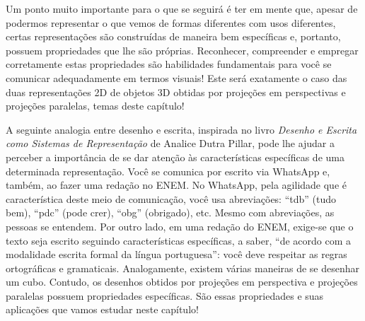 Um ponto muito importante para o que se seguirá é ter em mente que, apesar de podermos representar o que vemos de formas diferentes com usos diferentes, certas representações são construídas de maneira bem específicas e, portanto, possuem propriedades que lhe são próprias. Reconhecer, compreender e empregar corretamente estas propriedades são habilidades fundamentais para você se comunicar adequadamente em termos visuais! Este será exatamente o caso das duas representações 2D de objetos 3D obtidas por projeções em perspectivas e projeções paralelas, temas deste capítulo!

A seguinte analogia entre desenho e escrita, inspirada no livro \emph{Desenho e Escrita como Sistemas de Representação} de Analice Dutra Pillar, pode lhe ajudar a perceber a importância de se dar atenção às características específicas de uma determinada representação. Você se comunica por escrito via WhatsApp e, também, ao fazer uma redação no ENEM. No WhatsApp, pela agilidade que é característica deste meio de comunicação, você usa abreviações: “tdb” (tudo bem), “pdc” (pode crer), “obg” (obrigado), etc. Mesmo com abreviações, as pessoas se entendem. Por outro lado, em uma redação do ENEM, exige-se que o texto seja escrito seguindo características específicas, a saber, “de acordo com a modalidade escrita formal da língua portuguesa”: você deve respeitar as regras ortográficas e gramaticais. Analogamente, existem várias maneiras de se desenhar um cubo. Contudo, os desenhos obtidos por projeções em perspectiva e projeções paralelas possuem propriedades específicas. São essas propriedades e suas aplicações que vamos estudar neste capítulo!

